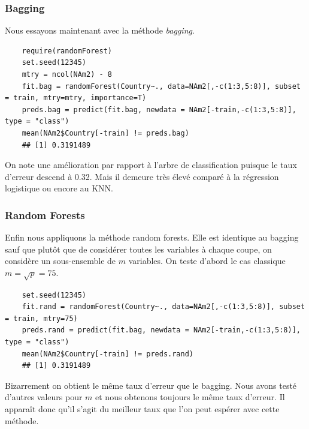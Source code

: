 \documentclass[12pt,a4paper]{article}
\begin{document}
\subsubsection{Bagging}
Nous essayons maintenant avec la méthode \textit{bagging}.\vspace{2mm}
\begin{lstlisting}
	require(randomForest)
	set.seed(12345)
	mtry = ncol(NAm2) - 8
	fit.bag = randomForest(Country~., data=NAm2[,-c(1:3,5:8)], subset = train, mtry=mtry, importance=T)
	preds.bag = predict(fit.bag, newdata = NAm2[-train,-c(1:3,5:8)], type = "class")
	mean(NAm2$Country[-train] != preds.bag)
	## [1] 0.3191489
\end{lstlisting}
On note une amélioration par rapport à l'arbre de classification puisque le taux d'erreur descend à 0.32. Mais il demeure très élevé comparé à la régression logistique ou encore au KNN.
\subsubsection{Random Forests}
Enfin nous appliquons la méthode random forests. Elle est identique au bagging sauf que plutôt que de considérer toutes les variables à chaque coupe, on considère un sous-ensemble de $m$ variables. On teste d'abord le cas classique $m=\sqrt{p} = 75$.\vspace{2mm}
\begin{lstlisting}
	set.seed(12345)
	fit.rand = randomForest(Country~., data=NAm2[,-c(1:3,5:8)], subset = train, mtry=75)
	preds.rand = predict(fit.bag, newdata = NAm2[-train,-c(1:3,5:8)], type = "class")
	mean(NAm2$Country[-train] != preds.rand)
	## [1] 0.3191489
\end{lstlisting}
Bizarrement on obtient le même taux d'erreur que le bagging. Nous avons testé d'autres valeurs pour $m$ et nous obtenons toujours le même taux d'erreur. Il apparaît donc qu'il s'agit du meilleur taux que l'on peut espérer avec cette méthode.
\end{document}
